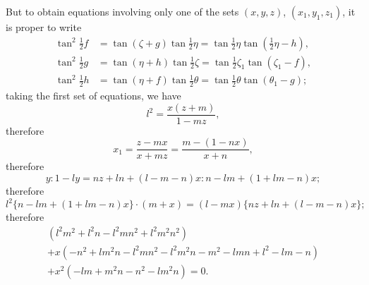 \documentclass[11pt,a4paper]{article}
\theoremstyle{plain}
\begin{document}
But to obtain equations involving only one of the sets $(x, y, z)$, $(x_1, y_1, z_1)$, it is proper to write
\begin{align*}
\tan^2\tfrac{1}{2}f &= \tan(\zeta + g)\tan\tfrac{1}{2}\eta = \tan\tfrac{1}{2}\eta\tan(\tfrac{1}{2}\eta - h),\\
\tan^2\tfrac{1}{2}g &= \tan(\eta + h)\tan\tfrac{1}{2}\zeta = \tan\tfrac{1}{2}\zeta_1\tan(\zeta_1 - f),\\
\tan^2\tfrac{1}{2}h &= \tan(\eta + f)\tan\tfrac{1}{2}\theta = \tan\tfrac{1}{2}\theta\tan(\theta_1 - g);
\end{align*}
taking the first set of equations, we have
\[
l^2 = \frac{x(z + m)}{1 - mz},
\]
therefore
\[
x_1 = \frac{z - mx}{x + mz} = \frac{m - (1 - nx)}{x + n},
\]
therefore
\[
y : 1 - ly = nz + ln + (l - m - n)x : n - lm + (1 + lm - n)x;
\]
therefore
\[
l^2\{n - lm + (1 + lm - n)x\}\cdot(m + x) = (l - mx)\{nz + ln + (l - m - n)x\};
\]
therefore
\begin{multline*}
(l^2m^2 + l^2n - l^2mn^2 + l^2m^2n^2)\\
+ x(-n^2 + lm^2n - l^2mn^2 - l^2m^2n - m^2 - lmn + l^2 - lm - n)\\
+ x^2(-lm + m^2n - n^2 - lm^2n) = 0.
\end{multline*}
\end{document}
